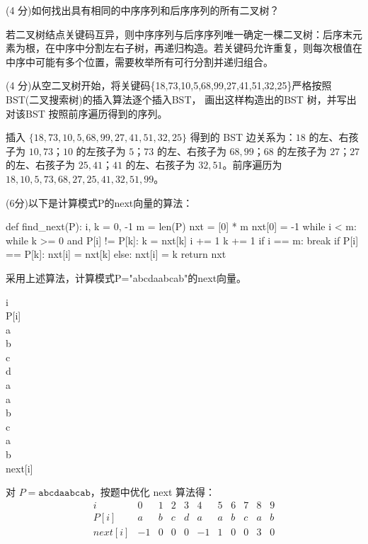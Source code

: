 \begin{question}
(4 分)如何找出具有相同的中序序列和后序序列的所有二叉树？
\begin{solution}
若二叉树结点关键码互异，则中序序列与后序序列唯一确定一棵二叉树：后序末元素为根，在中序中分割左右子树，再递归构造。若关键码允许重复，则每次根值在中序中可能有多个位置，需要枚举所有可行分割并递归组合。
\end{solution}
\end{question}

\begin{question}
(4 分)从空二叉树开始，将关键码\{18,73,10,5,68,99,27,41,51,32,25\}严格按照BST(二叉搜索树)的插入算法逐个插入BST， 画出这样构造出的BST 树，并写出对该BST 按照前序遍历得到的序列。
\begin{solution}
插入 $\{18,73,10,5,68,99,27,41,51,32,25\}$ 得到的 BST 边关系为：$18$ 的左、右孩子为 $10,73$；$10$ 的左孩子为 $5$；$73$ 的左、右孩子为 $68,99$；$68$ 的左孩子为 $27$；$27$ 的左、右孩子为 $25,41$；$41$ 的左、右孩子为 $32,51$。前序遍历为 $18,10,5,73,68,27,25,41,32,51,99$。
\end{solution}
\end{question}

\begin{question}
(6分)以下是计算模式P的next向量的算法：
\begin{pycode}
def find_next(P):
    i, k = 0, -1
    m = len(P)
    nxt = [0] * m
    nxt[0] = -1
    while i < m:
        while k >= 0 and P[i] != P[k]:
            k = nxt[k]
        i += 1
        k += 1
        if i == m:
            break
        if P[i] == P[k]:
            nxt[i] = nxt[k]
        else:
            nxt[i] = k
    return nxt
\end{pycode}
采用上述算法，计算模式P="abcdaabcab"的next向量。

i\\
P[i]\\
a\\
b\\
c\\
d\\
a\\
a\\
b\\
c\\
a\\
b\\
next[i]
\begin{solution}
对 $P=\texttt{abcdaabcab}$，按题中优化 next 算法得：
  \[
  \begin{array}{c|cccccccccc}
  i&0&1&2&3&4&5&6&7&8&9\\\hline
  P[i]&a&b&c&d&a&a&b&c&a&b\\
  next[i]&-1&0&0&0&-1&1&0&0&3&0
  \end{array}
  \]
\end{solution}
\end{question}

